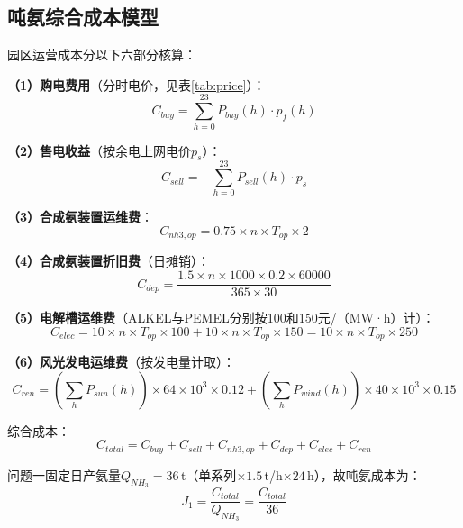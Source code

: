 \documentclass[UTF8,12pt,a4paper]{ctexart}
\begin{document}
\subsection{吨氨综合成本模型}

园区运营成本分以下六部分核算：

\noindent\textbf{（1）购电费用}（分时电价，见表\ref{tab:price}）：
\begin{equation}
  C_{buy} = \sum_{h=0}^{23} P_{buy}(h)\cdot p_f(h)
  \label{eq:cbuy}
\end{equation}

\noindent\textbf{（2）售电收益}（按余电上网电价$p_s$）：
\begin{equation}
  C_{sell} = -\sum_{h=0}^{23} P_{sell}(h)\cdot p_s
  \label{eq:csell}
\end{equation}

\noindent\textbf{（3）合成氨装置运维费}：
\begin{equation}
  C_{nh3,op} = 0.75 \times n \times T_{op} \times 2
  \label{eq:cnh3op}
\end{equation}

\noindent\textbf{（4）合成氨装置折旧费}（日摊销）：
\begin{equation}
  C_{dep} = \frac{1.5\times n\times 1000\times 0.2\times 60000}{365\times 30}
  \label{eq:cdep}
\end{equation}

\noindent\textbf{（5）电解槽运维费}（ALKEL与PEMEL分别按100和150元/（MW·h）计）：
\begin{equation}
  C_{elec} = 10\times n\times T_{op}\times 100 + 10\times n\times T_{op}\times 150
            = 10\times n\times T_{op}\times 250
  \label{eq:celec}
\end{equation}

\noindent\textbf{（6）风光发电运维费}（按发电量计取）：
\begin{equation}
  C_{ren} = \left(\sum_{h}P_{sun}(h)\right)\!\times 64\times 10^3\times 0.12
           + \left(\sum_{h}P_{wind}(h)\right)\!\times 40\times 10^3\times 0.15
  \label{eq:cren}
\end{equation}

\noindent 综合成本：
\begin{equation}
  C_{total} = C_{buy} + C_{sell} + C_{nh3,op} + C_{dep} + C_{elec} + C_{ren}
  \label{eq:ctotal}
\end{equation}

问题一固定日产氨量$Q_{NH_3}=36$\,t（单系列$\times1.5$\,t/h$\times24$\,h），故吨氨成本为：
\begin{equation}
  J_1 = \frac{C_{total}}{Q_{NH_3}} = \frac{C_{total}}{36}
  \label{eq:j1}
\end{equation}
\end{document}
